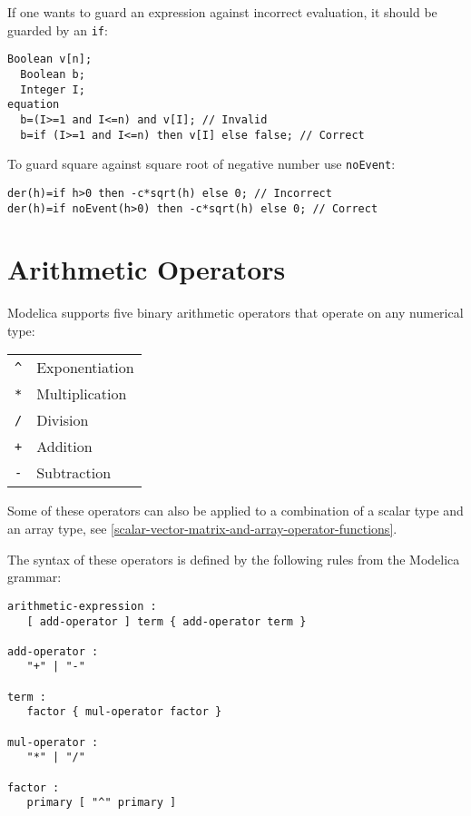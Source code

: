 \begin{example}
If one wants to guard an expression against incorrect evaluation, it should be guarded by an \lstinline!if!:
\begin{lstlisting}[language=modelica]
  Boolean v[n];
  Boolean b;
  Integer I;
equation
  b=(I>=1 and I<=n) and v[I]; // Invalid
  b=if (I>=1 and I<=n) then v[I] else false; // Correct
\end{lstlisting}

To guard square against square root of negative number use \lstinline!noEvent!:
\begin{lstlisting}[language=modelica]
der(h)=if h>0 then -c*sqrt(h) else 0; // Incorrect
der(h)=if noEvent(h>0) then -c*sqrt(h) else 0; // Correct
\end{lstlisting}
\end{example}

\section{Arithmetic Operators}\label{arithmetic-operators}

Modelica supports five binary arithmetic operators that operate on any
numerical type:
\begin{longtable}[c]{ll}
\lstinline!^! & Exponentiation\\
\lstinline!*! & Multiplication\\
\lstinline!/! & Division\\
\lstinline!+! & Addition\\
\lstinline!-! & Subtraction\\
\end{longtable}

Some of these operators can also be applied to a combination of a scalar
type and an array type, see \cref{scalar-vector-matrix-and-array-operator-functions}.

The syntax of these operators is defined by the following rules from the
Modelica grammar:
\begin{lstlisting}[language=grammar]
arithmetic-expression :
   [ add-operator ] term { add-operator term }

add-operator :
   "+" | "-"

term :
   factor { mul-operator factor }

mul-operator :
   "*" | "/"

factor :
   primary [ "^" primary ]
\end{lstlisting}


